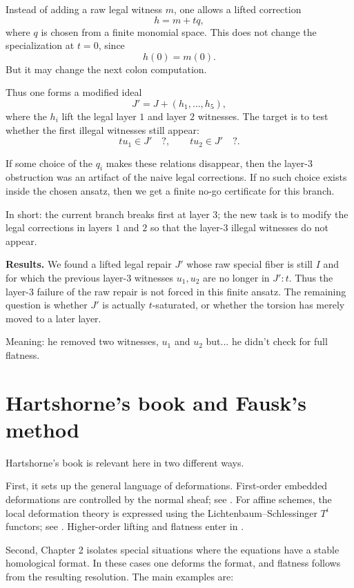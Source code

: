 Instead of adding a raw legal witness $m$,
one allows a lifted correction
$$
h=m+tq,
$$
where $q$ is chosen from a finite monomial
space. This does not change the
specialization at $t=0$, since
$$
h(0)=m(0).
$$
But it may change the next colon computation.

Thus one forms a modified ideal
$$
J'=J+(h_1,\dots,h_5),
$$
where the $h_i$ lift the legal layer $1$ and
layer $2$ witnesses. The target is to test
whether the first illegal witnesses still
appear:
$$
tu_1\in J' \quad ?,
\qquad
tu_2\in J' \quad ?.
$$

If some choice of the $q_i$ makes these
relations disappear, then the layer-$3$
obstruction was an artifact of the naive
legal corrections. If no such choice exists
inside the chosen ansatz, then we get a
finite no-go certificate for this branch.

In short: the current branch breaks first at
layer $3$; the new task is to modify the
legal corrections in layers $1$ and $2$ so
that the layer-$3$ illegal witnesses do not
appear.

\medskip\noindent
{\bf Results.} 
We found a lifted legal repair $J'$ whose raw
special fiber is still $I$ and for which the
previous layer-$3$ witnesses $u_1,u_2$ are no
longer in $J':t$. Thus the layer-$3$ failure
of the raw repair is not forced in this
finite ansatz. The remaining question is
whether $J'$ is actually $t$-saturated, or
whether the torsion has merely moved to a
later layer.

Meaning: he removed two witnesses, $u_1$
and $u_2$
but... he didn't check for full flatness.

\section{Hartshorne's book and Fausk's
method}
\label{section-hartshorne-and-fausk}

Hartshorne's book is relevant here in two
different ways.

First, it sets up the general language of
deformations. First-order embedded
deformations are controlled by the normal
sheaf; see \cite[\S 2]{Hartshorne-deformation}.
For affine schemes, the local deformation
theory is expressed using the
Lichtenbaum--Schlessinger $T^i$ functors;
see \cite[\S\S 3,5]{Hartshorne-deformation}.
Higher-order lifting and flatness enter in
\cite[\S 6]{Hartshorne-deformation}.

Second, Chapter 2 isolates special
situations where the equations have a
stable homological format. In these cases
one deforms the format, and flatness follows
from the resulting resolution. The main
examples are:

